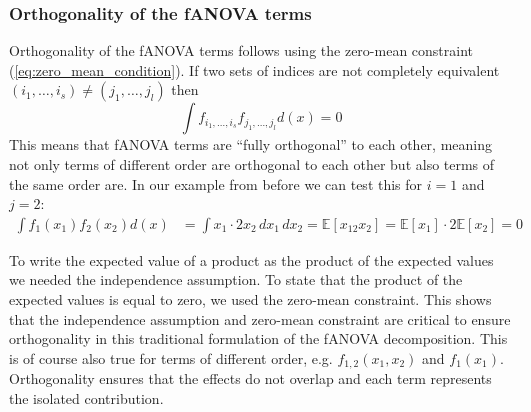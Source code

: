 \subsubsection*{Orthogonality of the fANOVA terms}
Orthogonality of the fANOVA terms follows using the zero-mean constraint (\autoref{eq:zero_mean_condition}). If two sets of indices are not completely equivalent $(i_1, \dots, i_s) \neq (j_1, \dots, j_l)$ then
\begin{equation}
    \int f_{i_{1}, \dots, i_{s}} f_{j_{1}, \dots, j_{l}} d(x) = 0
    \label{eq:orthogonality}
\end{equation}
This means that fANOVA terms are ``fully orthogonal'' to each other, meaning not only terms of different order are orthogonal to each other but also terms of the same order are.
In our example from before we can test this for $i = 1$ and $j = 2$:
\begin{align*}
    \int f_{1}(x_1) f_{2}(x_2) d(x) &= \int x_1 \cdot 2x_2 \, dx_1 \, dx_2 = \mathbb{E}[x_12x_2] = \mathbb{E}[x_1] \cdot 2\mathbb{E}[x_2] = 0
\end{align*}

To write the expected value of a product as the product of the expected values we needed the independence assumption. To state that the product of the expected values is equal to zero, we used the zero-mean constraint. This shows that the independence assumption and zero-mean constraint are critical to ensure orthogonality in this traditional formulation of the fANOVA decomposition. This is of course also true for terms of different order, e.g. \( f_{1,2}(x_1, x_2) \) and \( f_{1}(x_1) \). Orthogonality ensures that the effects do not overlap and each term represents the isolated contribution.

